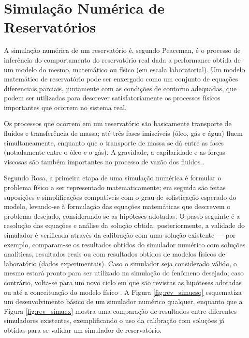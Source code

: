 
\section{Simulação Numérica de Reservatórios}

A simulação numérica de um reservatório é, segundo Peaceman, é o processo de inferência do comportamento do reservatório real dada a performance obtida de um modelo do mesmo, matemático ou físico (em escala laboratorial). Um modelo matemático de reservatório pode ser enxergado como um conjunto de equações diferenciais parciais, juntamente com as condições de contorno adequadas, que podem ser utilizadas para descrever satisfatoriamente os processos físicos importantes que ocorrem no sistema real.

Os processos que ocorrem em um reservatório são basicamente transporte de fluidos e transferência de massa; até três fases imiscíveis (óleo, gás e água) fluem simultaneamente, enquanto que o transporte de massa se dá entre as fases (notadamente entre o óleo e o gás). A gravidade, a capilaridade e as forças viscosas são também importantes no processo de vazão dos fluidos \cite{simres}.

Segundo Rosa, a primeira etapa de uma simulação numérica é formular o problema físico a ser representado matematicamente; em seguida são feitas suposições e simplificações compatíveis com o grau de sofisticação esperado do modelo, levando-se à formulação das equações matemáticas que descrevem o problema desejado, considerando-se as hipóteses adotadas. O passo seguinte é a resolução das equações e análise da solução obtida; posteriormente, a validade do simulador é verificada através da calibração com uma solução existente --- por exemplo, comparam-se os resultados obtidos do simulador numérico com soluções analíticas, resultados reais ou com resultados obtidos de modelos físicos de laboratório (dados experimentais). Caso o simulador seja considerado válido, o mesmo estará pronto para ser utilizado na simulação do fenômeno desejado; caso contrário, volta-se para um novo ciclo em que são revistas as hipóteses adotadas ou até a conceituação do modelo físico \cite[p. 520]{engres}. A Figura \ref{fig:rev_simuesq} esquematiza um desenvolvimento básico de um simulador numérico qualquer, enquanto que a Figura \ref{fig:rev_simuex} mostra uma comparação de resultados entre diferentes simuladores existentes, exemplificando o uso da calibração com soluções já obtidas para se validar um simulador de reservatório. 

